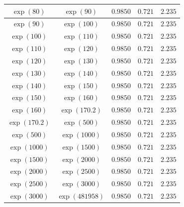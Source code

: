 \documentclass[reqno]{amsart}
\numberwithin{equation}{section}
\theoremstyle{remark}
\begin{document}
\begin{table}[h]
\begin{tabular}{|c|c|c|c|c|}
\hline
$\exp(80)$ & $\exp(90)$ & $0.9850 $ & $0.721$ & $2.235$\\
\hline
$\exp(90)$ & $\exp(100)$ &$0.9850 $ & $0.721$ & $2.235$\\
\hline
$\exp(100)$ & $\exp(110)$ & $0.9850 $ & $0.721$ & $2.235$\\
\hline
$\exp(110)$ & $\exp(120)$ & $0.9850 $ & $0.721$ & $2.235$\\
\hline
$\exp(120)$ & $\exp(130)$ & $0.9850 $ & $0.721$ & $2.235$\\
\hline
$\exp(130)$ & $\exp(140)$ & $0.9850$ & $0.721$ & $2.235$ \\
\hline
$\exp(140)$ & $\exp(150)$ & $0.9850$ & $0.721$ & $2.235$ \\
\hline
$\exp(150)$ & $\exp(160)$ & $0.9850$ & $0.721$ & $2.235$ \\
\hline
$\exp(160)$ & $\exp(170.2)$ & $0.9850$ & $0.721$ & $2.235$ \\
\hline
$\exp(170.2)$ & $\exp(500)$ &  $0.9850$ & $0.721$ & $2.235$ \\
\hline
$\exp(500)$ & $\exp(1000)$ & $0.9850$ & $0.721$ & $2.235$   \\
\hline
$\exp(1000)$ & $\exp(1500)$ & $0.9850$ & $0.721$ & $2.235$  \\
\hline
$\exp(1500)$ & $\exp(2000)$ & $0.9850$ & $0.721$ & $2.235$  \\
\hline
$\exp(2000)$ & $\exp(2500)$ & $0.9850$ & $0.721$ & $2.235$\\
\hline
$\exp(2500)$ & $\exp(3000)$ & $0.9850$ & $0.721$ & $2.235$\\
\hline
$\exp(3000)$ & $\exp(481958)$ & $0.9850$ & $0.721$ & $2.235$\\
\hline
\end{tabular}
\label{alpha0b1b2}
\end{table}
\end{document}
